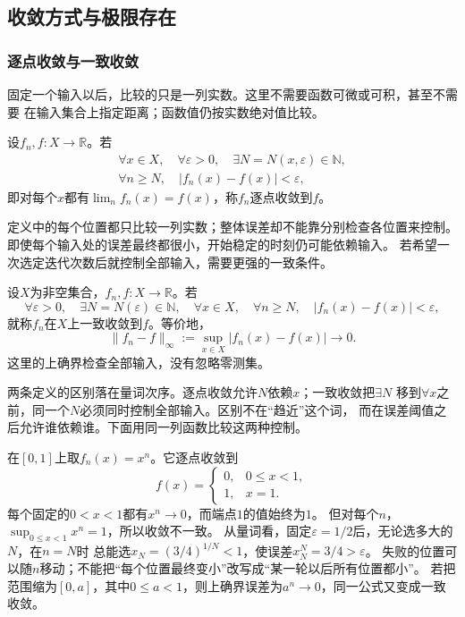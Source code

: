 \subsection{收敛方式与极限存在}
\subsubsection{逐点收敛与一致收敛}

固定一个输入以后，比较的只是一列实数。这里不需要函数可微或可积，甚至不需要
在输入集合上指定距离；函数值仍按实数绝对值比较。
\begin{definition}[逐点收敛]
\label{def:analysis-pointwise-almost-everywhere-convergence}
设$f_n,f:X\to\mathbb{R}$。若
\[
 \begin{gathered}
  \forall x\in X,\quad
  \forall\varepsilon>0,\quad
  \exists N=N(x,\varepsilon)\in\mathbb N,\\
  \forall n\geq N,\quad
  |f_n(x)-f(x)|<\varepsilon,
 \end{gathered}
\]
即对每个$x$都有$\lim_n f_n(x)=f(x)$，称$f_n$逐点收敛到$f$。
\end{definition}


定义中的每个位置都只比较一列实数；整体误差却不能靠分别检查各位置来控制。
即使每个输入处的误差最终都很小，开始稳定的时刻仍可能依赖输入。
若希望一次选定迭代次数后就控制全部输入，需要更强的一致条件。
\begin{definition}[函数列的一致收敛]
\label{def:analysis-uniform-convergence}
设$X$为非空集合，$f_n,f:X\to\mathbb R$。若
\[
  \forall\varepsilon>0,\quad
  \exists N=N(\varepsilon)\in\mathbb N,\quad
  \forall x\in X,\quad
  \forall n\geq N,\quad
  |f_n(x)-f(x)|<\varepsilon,
\]
就称$f_n$在$X$上一致收敛到$f$。等价地，
\begin{equation}
  \lVert f_n-f\rVert_{\infty}
  :=
  \sup_{x\in X}|f_n(x)-f(x)|
  \longrightarrow0.
\label{eq:analysis-uniform-convergence}
\end{equation}
这里的上确界检查全部输入，没有忽略零测集。
\end{definition}


两条定义的区别落在量词次序。逐点收敛允许$N$依赖$x$；一致收敛把$\exists N$
移到$\forall x$之前，同一个$N$必须同时控制全部输入。区别不在“趋近”这个词，
而在误差阈值之后允许谁依赖谁。下面用同一列函数比较这两种控制。

在$[0,1]$上取$f_n(x)=x^n$。它逐点收敛到
\[
 f(x)=
 \begin{cases}
  0,&0\leq x<1,\\
  1,&x=1.
 \end{cases}
\]
每个固定的$0<x<1$都有$x^n\to0$，而端点$1$的值始终为$1$。
但对每个$n$，$\sup_{0\leq x<1}x^n=1$，所以收敛不一致。
从量词看，固定$\varepsilon=1/2$后，无论选多大的$N$，在$n=N$时
总能选$x_N=(3/4)^{1/N}<1$，使误差$x_N^N=3/4>\varepsilon$。
失败的位置可以随$n$移动；不能把“每个位置最终变小”改写成“某一轮以后所有位置都小”。
若把范围缩为$[0,a]$，其中$0\leq a<1$，则上确界误差为$a^n\to0$，同一公式又变成一致收敛。

